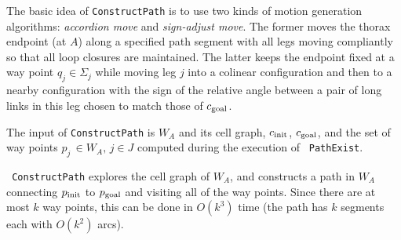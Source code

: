 \documentclass[twocolumn]{IEEEtran}
\begin{document}
\medskip

The basic idea of {\tt ConstructPath} 
is to use
two kinds of motion generation algorithms: {\sl accordion move} and
{\sl sign-adjust move}.  The former moves the thorax endpoint (at
$A$) along a specified path segment with all legs moving compliantly
so that all loop closures are maintained.
The latter keeps the endpoint fixed at a way point $q_j \in
\Sigma_j$ while moving
leg $j$ into a colinear configuration and then to a nearby
configuration with the sign of the relative angle between a pair of
long links in this leg chosen to match those of $c_{\rm goal}$.

The input of {\tt ConstructPath} is $W_A$ and its cell graph,
$c_{\rm init}$, $c_{\rm goal}$, and the set of way points $p_{j}\,
\in W_A, \, j\in J$ computed during the execution of {\tt
PathExist}.

\noindent {} {\tt
ConstructPath} explores the cell graph of $W_A$, and constructs a
path in $W_A$ connecting $p_{\rm init}$ to $p_{\rm goal}$ and
visiting all of the way points. Since there are at most $k$ way
points, this can be done in $O(k^3)$ time (the path has $k$ segments
each with $O(k^2)$ arcs).
\end{document}
